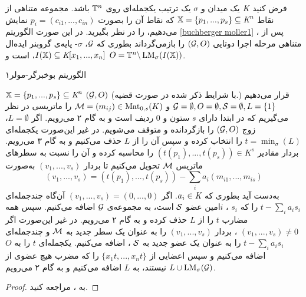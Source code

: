 \begin{proposition}

فرض کنید 
$\textit{K}$
یک میدان و 
$\sigma$
یک ترتیب یکجمله‌ای روی 
${\mathbb{T}}^{n}$
باشد. مجموعه‌  متناهی از نقاط 
$\mathbb{X} = \{p_{1},...,p_{s}\}\subseteq \textit{K}^{n}$
که نقاط آن را بصورت 
$p_{i} = (c_{i1},...,c_{i n})$
نمایش می‌دهیم، را در نظر بگیرید. در این صورت الگوریتم  
\ref{buchberger moller1}
، پس از متناهی مرحله اجرا دوتایی 
$({\mathcal G}, O)$
را بازمی‌گرداند بطوری که 
${\mathcal G}$،
$\sigma$-
پایه‌ی گروبنر ایده‌ال 
$I(\mathbb{X})\subseteq \textit{K}[x_{1},...,x_{n}]$، 
است و 
$O = {\mathbb{T}}^{n} \backslash \operatorname{\mathrm{LM}}_{\sigma}(I(\mathbb{X}))$.

\renewcommand{\algorithmicrequire}{\textbf{ورودی}}
\renewcommand{\algorithmicensure}{\textbf{خروجی}}
\begin{algorithm}[h]
	\caption{الگوریتم بوخبرگر-مولر۱}
	\label{buchberger moller1}
	\begin{algorithmic}[1]				
		\REQUIRE $\mathbb{X} = \{p_{1},...,p_{s}\}\subseteq \textit{K}^{n}$
		\ENSURE $({\mathcal G}, O)$
		{\footnotesize (با شرایط ذکر شده در صورت قضیه.) }
		\STATE قرار می‌دهیم 
		${\mathcal G} = \emptyset, O = \emptyset, {\mathcal S} = \emptyset, L = \{1\}$
		و 
		${\mathcal M} = (m_{ij})\in \operatorname{\mathrm{Mat}}_{0,s}(K)$
		را ماتریسی در نظر می‌گیریم که در ابتدا دارای 
		$s$
		ستون و 
		$0$
		ردیف است و به گام ۲ می‌رویم. 
		\STATE اگر 
		$L = \emptyset$،
		 زوج 
		$({\mathcal G}, O)$
		را بازگردانده و متوقف می‌شویم. در غیر این‌صورت یکجمله‌ای 
		$t = \min_{\sigma}(L)$
		را انتخاب کرده و سپس آن را از 
		$L$
		حذف می‌کنیم و به گام ۳ می‌رویم.
		\STATE بردار  مقادیر
		$(t(p_{1}),...,t(p_{s}))\in K^{s}$
		را محاسبه کرده و آن را نسبت به سطرهای ماتریس 
		${\mathcal M}$
		تحویل می‌کنیم تا بردار 
		$(v_{1},...,v_{s})$
		به‌صورت 
		$$(v_{1},...,v_{s}) = (t(p_{1}),...,t(p_{s}))  - \sum_{i}a_{i}(m_{i1},...,m_{is})$$
		به‌دست آید بطوری که 
		$a_{i}\in \textit{K}$.
		\STATE اگر 
		$(v_{1},...,v_{s}) = (0,...,0)$
		آن‌گاه چندجمله‌ای 
		$t - \sum_{i}a_{i}s_{i}$
		را که 
		$s_{i}$
		، 
		$i$امین 
		عضو 
		${\mathcal S}$
		است، به مجموعه‌ی 
		${\mathcal G}$
		اضافه می‌کنیم. سپس همه‌  مضارب 
		$t$
		را از 
		$L$
		حذف کرده و به گام ۲ می‌رویم.
		\STATE در غیر این‌صورت اگر  
		$(v_{1},...,v_{s}) \neq 0$
		، بردار 
		$(v_{1},...,v_{s})$
		را به عنوان یک سطر جدید به 
		${\mathcal M}$
		و چندجمله‌ای 
		$t - \sum_{i}a_{i}s_{i}$
		را به عنوان یک عضو جدید به 
		${\mathcal S}$
		، اضافه می‌کنیم. یکجمله‌ای 
		$t$
		را به 
		$O$
		اضافه می‌کنیم و سپس  اعضایی از 
		$\{x_{1}t,...,x_{n}t\}$
		را که مضرب هیچ عضوی از 
		$L\cup \operatorname{\mathrm{LM}}_{\sigma}({\mathcal G})$
		نیستند، به 
		$L$
		اضافه می‌کنیم و به گام ۲ می‌رویم. 
	\end{algorithmic}
\end{algorithm}
\end{proposition}
\begin{proof}
به 
{\small \cite[ص.۳۹۲]{cca2_kreuzer}}، 
 مراجعه کنید. 
\end{proof}

